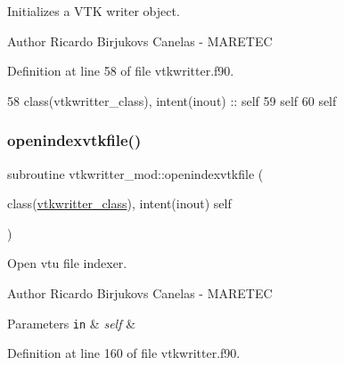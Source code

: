 Initializes a V\+TK writer object. 

\begin{DoxyAuthor}{Author}
Ricardo Birjukovs Canelas -\/ M\+A\+R\+E\+T\+EC 
\end{DoxyAuthor}


Definition at line 58 of file vtkwritter.\+f90.


\begin{DoxyCode}
58     \textcolor{keywordtype}{class}(vtkwritter\_class), \textcolor{keywordtype}{intent(inout)} :: self
59     self%
60     self%
\end{DoxyCode}
\mbox{\label{namespacevtkwritter__mod_a0c26bb22a8b7dd9f9da69309ad65d669}} 
\subsubsection{\texorpdfstring{openindexvtkfile()}{openindexvtkfile()}}
{\footnotesize\ttfamily subroutine vtkwritter\+\_\+mod\+::openindexvtkfile (\begin{DoxyParamCaption}\item[{class(\mbox{\hyperlink{structvtkwritter__mod_1_1vtkwritter__class}{vtkwritter\+\_\+class}}), intent(inout)}]{self }\end{DoxyParamCaption})\hspace{0.3cm}{\ttfamily [private]}}



Open vtu file indexer. 

\begin{DoxyAuthor}{Author}
Ricardo Birjukovs Canelas -\/ M\+A\+R\+E\+T\+EC 
\end{DoxyAuthor}

\begin{DoxyParams}[1]{Parameters}
\mbox{\tt in}  & {\em self} & \\
\hline
\end{DoxyParams}


Definition at line 160 of file vtkwritter.\+f90.


